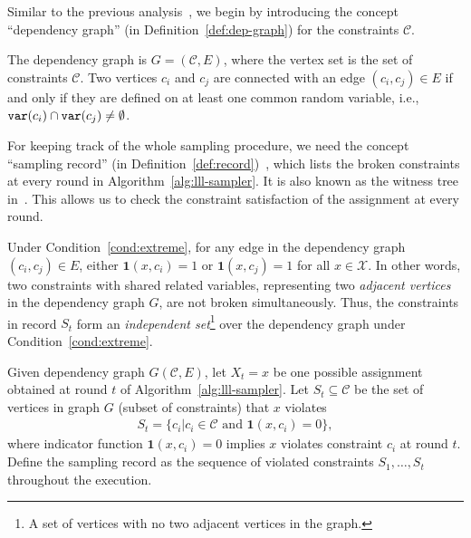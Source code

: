 Similar to the previous
analysis~\citep{DBLP:journals/jacm/GuoJL19,DBLP:journals/arxiv/jerrum2021}, we
begin by introducing the concept ``dependency graph'' (in
Definition~\ref{def:dep-graph}) for the constraints $\mathcal{C}$.

\begin{definition} \label{def:dep-graph}
    The dependency graph is $G=(\mathcal{C},E)$, where the vertex set is the set of constraints $\mathcal{C}$.  Two vertices $c_i$ and $c_j$ are connected with an edge $(c_i,c_j)\in E$ if and only if they are defined on at least one common random variable, i.e., $\mathtt{var}(c_i)\cap\mathtt{var}(c_j) \neq \emptyset$.
\end{definition}

For keeping track of the whole sampling procedure, we need the concept
``sampling record'' (in
Definition~\ref{def:record})~\citep{DBLP:journals/jacm/GuoJL19}, which lists the
broken constraints at every round in Algorithm~\ref{alg:lll-sampler}. It is
also known as the witness tree in~\citep{DBLP:journals/jacm/MoserT10}. This
allows us to check the constraint satisfaction of the assignment at every
round.

Under Condition~\ref{cond:extreme}, for any edge in the dependency graph
$(c_i,c_j) \in E$, either $\mathbf{1}(x,c_i)=1$ or $\mathbf{1}(x,c_j)=1$ for
all $x\in \mathcal{X}$. In other words, two constraints with shared related
variables, representing two \textit{adjacent vertices} in the dependency graph
$G$, are not broken simultaneously. Thus, the constraints in record $S_t$ form
an \textit{independent set}\footnote{A set of vertices with no two adjacent
    vertices in the graph.} over the dependency graph under
Condition~\ref{cond:extreme}.

\begin{definition} \label{def:record}
    Given dependency graph $G(\mathcal{C},E)$, let $X_t=x$ be  one possible assignment obtained at round $t$ of Algorithm~\ref{alg:lll-sampler}. Let $S_t\subseteq \mathcal{C}$ be the set of vertices in graph $G$ (subset of constraints) that $x$ violates
    \begin{align}
        S_t = \{c_i|c_i\in \mathcal{C}\text{ and } \mathbf{1}(x,c_i)=0\},
    \end{align}
    where indicator function $\mathbf{1}(x,c_i)=0$ implies  $x$ violates constraint $c_i$  at round $t$.
    Define the sampling record as the sequence of violated constraints  $S_1,\ldots,S_t$ throughout the execution.
\end{definition}

